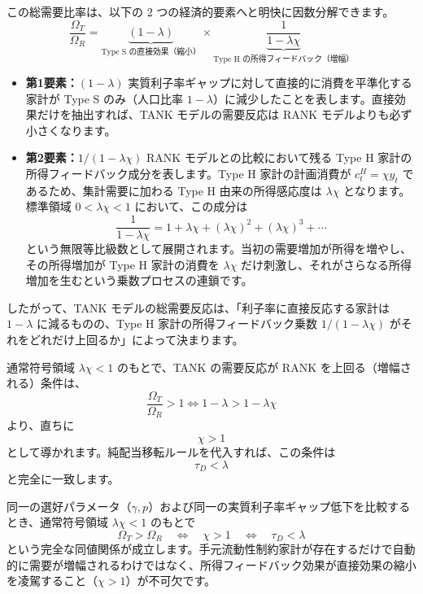 \documentclass[
  japanese,
  lualatex,
  ja=standard,
  12pt,
  a4paper]{ltjsarticle}
\providecommand{\tightlist}{%
  \setlength{\itemsep}{0pt}\setlength{\parskip}{0pt}}
\begin{document}
この総需要比率は、以下の 2 つの経済的要素へと明快に因数分解できます。 \[
\frac{\Omega_T}{\Omega_R}
=
\underbrace{(1-\lambda)}_{\text{Type S の直接効果（縮小）}}
\times
\underbrace{\frac{1}{1-\lambda\chi}}_{\text{Type H の所得フィードバック（増幅）}}
\]

\begin{itemize}
\tightlist
\item
  \textbf{第1要素：\((1-\lambda)\)}
  実質利子率ギャップに対して直接的に消費を平準化する家計が Type S
  のみ（人口比率
  \(1-\lambda\)）に減少したことを表します。直接効果だけを抽出すれば、TANK
  モデルの需要反応は RANK モデルよりも必ず小さくなります。
\item
  \textbf{第2要素：\(1/(1-\lambda\chi)\)} RANK
  モデルとの比較において残る Type H
  家計の所得フィードバック成分を表します。Type H 家計の計画消費が
  \(c_t^H = \chi y_t\) であるため、集計需要に加わる Type H
  由来の所得感応度は \(\lambda\chi\) となります。標準領域
  \(0 < \lambda\chi < 1\) において、この成分は \[
  \frac{1}{1-\lambda\chi} = 1 + \lambda\chi + (\lambda\chi)^2 + (\lambda\chi)^3 + \cdots
  \]
  という無限等比級数として展開されます。当初の需要増加が所得を増やし、その所得増加が
  Type H 家計の消費を \(\lambda\chi\)
  だけ刺激し、それがさらなる所得増加を生むという乗数プロセスの連鎖です。
\end{itemize}

したがって、TANK モデルの総需要反応は、「利子率に直接反応する家計は
\(1-\lambda\) に減るものの、Type H 家計の所得フィードバック乗数
\(1/(1-\lambda\chi)\) がそれをどれだけ上回るか」によって決まります。

通常符号領域 \(\lambda\chi < 1\) のもとで、TANK の需要反応が RANK
を上回る（増幅される）条件は、 \[
\frac{\Omega_T}{\Omega_R} > 1 \iff 1 - \lambda > 1 - \lambda\chi
\] より、直ちに \[
\chi > 1
\] として導かれます。純配当移転ルールを代入すれば、この条件は \[
\tau_D < \lambda
\] と完全に一致します。


\begin{tcolorbox}[enhanced jigsaw, arc=.35mm, bottomrule=.15mm, bottomtitle=1mm, breakable, colback=white, colbacktitle=quarto-callout-important-color!10!white, colframe=quarto-callout-important-color-frame, coltitle=black, left=2mm, leftrule=.75mm, opacityback=0, opacitybacktitle=0.6, rightrule=.15mm, title=\textcolor{quarto-callout-important-color}{\faExclamation}\hspace{0.5em}{主結果}, titlerule=0mm, toprule=.15mm, toptitle=1mm]

同一の選好パラメータ（\(\gamma, p\)）および同一の実質利子率ギャップ低下を比較するとき、通常符号領域
\(\lambda\chi<1\) のもとで \[
\Omega_T > \Omega_R \quad \Longleftrightarrow \quad \chi > 1 \quad \Longleftrightarrow \quad \tau_D < \lambda
\]
という完全な同値関係が成立します。手元流動性制約家計が存在するだけで自動的に需要が増幅されるわけではなく、所得フィードバック効果が直接効果の縮小を凌駕すること（\(\chi>1\)）が不可欠です。

\end{tcolorbox}
\end{document}
